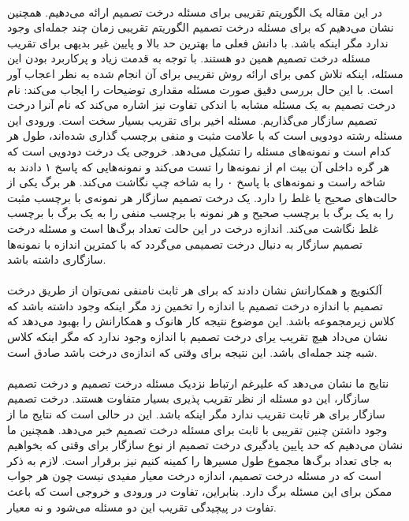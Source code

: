 \documentclass[a4paper]{article}
\begin{document}
	\paragraph{}
	در این مقاله یک الگوریتم تقریبی 
	برای مسئله درخت تصمیم ارائه می‌دهیم.
	همچنین نشان می‌دهیم که برای مسئله درخت تصمیم الگوریتم تقریبی زمان چند جمله‌ای وجود ندارد مگر اینکه 
	باشد.
	با دانش فعلی ما بهترین حد بالا و پایین غیر بدیهی برای تقریب مسئله درخت تصمیم همین دو هستند.
	با توجه به قدمت زیاد و پرکاربرد بودن این مسئله، اینکه تلاش کمی برای ارائه روش تقریبی برای آن انجام شده به نظر
	اعجاب آور است.
	با این حال بررسی دقیق صورت مسئله مقداری توضیحات را ایجاب می‌کند:
	نام درخت تصمیم به یک مسئله مشابه با اندکی تفاوت نیز اشاره می‌کند که نام آنرا درخت تصمیم سازگار می‌گذاریم.
	مسئله اخیر برای تقریب بسیار سخت است. ورودی این مسئله 
	رشته دودویی است که با علامت مثبت و منفی برچسب گذاری شده‌اند، طول هر کدام 
	است و نمونه‌های مسئله را تشکیل می‌دهد. خروجی یک درخت دودویی است که هر گره داخلی آن بیت 
	ام از نمونه‌‌ها را تست می‌کند و نمونه‌هایی که پاسخ ۱ دادند به شاخه راست و نمونه‌های با پاسخ ۰ را به شاخه چپ نگاشت
	می‌کند. هر برگ یکی از حالت‌های صحیح یا غلط را دارد. یک درخت تصمیم سازگار هر نمونه‌ی با برچسب مثبت را به یک برگ
	با برچسب صحیح و هر نمونه با برچسب منفی را به یک برگ با برچسب غلط نگاشت می‌کند. اندازه درخت در این حالت تعداد
	برگ‌ها است و مسئله درخت تصمیم سازگار به دنبال درخت تصمیمی می‌گردد که با کمترین اندازه با نمونه‌ها سازگاری داشته باشد.
	\paragraph{}
	آلکنویچ و همکارانش نشان دادند که برای هر ثابت نامنفی
	نمی‌توان از طریق درخت تصمیم با اندازه
	درخت تصمیم با اندازه
	را تخمین زد مگر اینکه
	وجود داشته باشد که کلاس
	زیرمجموعه 
	باشد. این موضوع نتیجه کار هانوک و همکارانش را بهبود می‌دهد که نشان می‌داد هیچ تقریب 
	یرای درخت تصمیم با اندازه 
	وجود ندارد که 
	مگر اینکه کلاس 
	شبه چند جمله‌ای باشد. این نتیجه برای وقتی که اندازه‌ی درخت
	باشد صادق است.
	\paragraph{}
	نتایج ما نشان می‌دهد که علیرغم ارتباط نزدیک مسئله درخت تصمیم و درخت تصمیم سازگار، این دو مسئله از نظر تقریب پذیری بسیار متفاوت هستند. درخت تصمیم سازگار برای هر ثابت
	تقریب 
	ندارد مگر اینکه
	باشد. این در حالی است که نتایج ما از وجود داشتن چنین تقریبی با ثابت
	برای مسئله درخت تصمیم خبر می‌دهد.
	همچنین ما نشان می‌دهیم که حد پایین یادگیری درخت تصمیم از نوع سازگار برای وقتی که بخواهیم به جای تعداد برگ‌ها
	مجموع طول مسیرها را کمینه کنیم نیز برقرار است. لازم به ذکر است که در مسئله درخت تصمیم، اندازه درخت معیار مفیدی
	نیست چون هر جواب ممکن برای این مسئله 
	برگ دارد. بنابراین، تفاوت در ورودی و خروجی است که باعث تفاوت در پیچیدگی تقریب این دو مسئله می‌شود و نه معیار.
\end{document}
